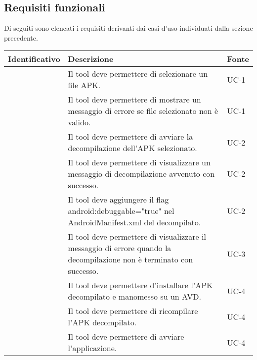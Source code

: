 \subsection{Requisiti funzionali}\label{subsec:requisiti-funzionali}
Di seguiti sono elencati i requisiti derivanti dai casi d'uso individuati dalla sezione precedente.
\begin{longtable}{ | c| C{7cm} |C{3cm} |}
    \hline
    \textbf{Identificativo} & \textbf{Descrizione}                                                                                                  & \textbf{Fonte} \\\hline
           & Il tool deve permettere di selezionare un file APK.                                                                   & UC-1           \\\hline
        & Il tool deve permettere di mostrare un messaggio di errore se file selezionato non è valido.                          & UC-1           \\\hline
    \setcounter{subCount}{0}

           & Il tool deve permettere di avviare la decompilazione dell'APK selezionato.                                            & UC-2           \\\hline
        & Il tool deve permettere di visualizzare un messaggio di decompilazione avvenuto con successo.                         & UC-2           \\\hline
        & Il tool deve aggiungere il flag android:debuggable="true" nel AndroidManifest.xml del decompilato.                    & UC-2           \\\hline
    \setcounter{subCount}{0}

           & Il tool deve permettere di visualizzare il messaggio di errore quando la decompilazione non è terminato con successo. & UC-3           \\\hline
           & Il tool deve permettere d'installare l'APK decompilato e manomesso su un AVD.                                         & UC-4           \\\hline
        & Il tool deve permettere di ricompilare l'APK decompilato.                                                             & UC-4           \\\hline
        & Il tool deve permettere di avviare l'applicazione.                                                                    & UC-4           \\\hline


\end{longtable}

